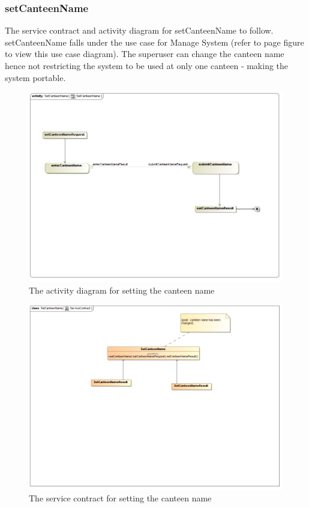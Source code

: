 \documentclass[a4paper,12pt]{report}
\begin{document}
\subsubsection{setCanteenName}
The service contract and activity diagram for setCanteenName to follow. setCanteenName falls under the use case for Manage System (refer to page   figure   to view this use case diagram). The superuser can change the canteen name hence not restricting the system to be used at only one canteen - making the system portable. 
\begin{figure}[H]
  \centering
    \includegraphics[width=1.0\textwidth]{../images/SetCanteenNameActivity.png}
    \caption{The activity diagram for setting the canteen name} 
\end{figure}

\begin{figure}[H]
	\centering
	\includegraphics[width=1.0\textwidth]{../images/SetCanteenServiceContract.png}
	\caption{The service contract for setting the canteen name}
\end{figure}
\end{document}

